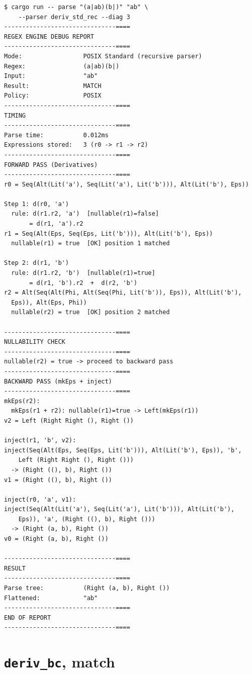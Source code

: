\begin{verbatim}
$ cargo run -- parse "(a|ab)(b|)" "ab" \
    --parser deriv_std_rec --diag 3
-------------------------------====
REGEX ENGINE DEBUG REPORT
-------------------------------====
Mode:                 POSIX Standard (recursive parser)
Regex:                (a|ab)(b|)
Input:                "ab"
Result:               MATCH
Policy:               POSIX
-------------------------------====
TIMING
-------------------------------====
Parse time:           0.012ms
Expressions stored:   3 (r0 -> r1 -> r2)
-------------------------------====
FORWARD PASS (Derivatives)
-------------------------------====
r0 = Seq(Alt(Lit('a'), Seq(Lit('a'), Lit('b'))), Alt(Lit('b'), Eps))

Step 1: d(r0, 'a')
  rule: d(r1.r2, 'a')  [nullable(r1)=false]
       = d(r1, 'a').r2
r1 = Seq(Alt(Eps, Seq(Eps, Lit('b'))), Alt(Lit('b'), Eps))
  nullable(r1) = true  [OK] position 1 matched

Step 2: d(r1, 'b')
  rule: d(r1.r2, 'b')  [nullable(r1)=true]
       = d(r1, 'b').r2  +  d(r2, 'b')
r2 = Alt(Seq(Alt(Phi, Alt(Seq(Phi, Lit('b')), Eps)), Alt(Lit('b'),
  Eps)), Alt(Eps, Phi))
  nullable(r2) = true  [OK] position 2 matched

-------------------------------====
NULLABILITY CHECK
-------------------------------====
nullable(r2) = true -> proceed to backward pass
-------------------------------====
BACKWARD PASS (mkEps + inject)
-------------------------------====
mkEps(r2):
  mkEps(r1 + r2): nullable(r1)=true -> Left(mkEps(r1))
v2 = Left (Right Right (), Right ())

inject(r1, 'b', v2):
inject(Seq(Alt(Eps, Seq(Eps, Lit('b'))), Alt(Lit('b'), Eps)), 'b',
    Left (Right Right (), Right ()))
  -> (Right ((), b), Right ())
v1 = (Right ((), b), Right ())

inject(r0, 'a', v1):
inject(Seq(Alt(Lit('a'), Seq(Lit('a'), Lit('b'))), Alt(Lit('b'),
    Eps)), 'a', (Right ((), b), Right ()))
  -> (Right (a, b), Right ())
v0 = (Right (a, b), Right ())

-------------------------------====
RESULT
-------------------------------====
Parse tree:           (Right (a, b), Right ())
Flattened:            "ab"
-------------------------------====
END OF REPORT
-------------------------------====
\end{verbatim}

\section{\texttt{deriv\_bc}, match}
\label{app:report-deriv-bc-match}

